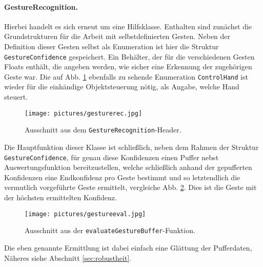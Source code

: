 	\paragraph{GestureRecognition.} Hierbei handelt es sich erneut um eine Hilfsklasse. Enthalten sind zunächst die Grundstrukturen für die Arbeit mit selbstdefinierten Gesten. Neben der Definition dieser Gesten selbst als Enumeration ist hier die Struktur \glqq \texttt{GestureConfidence}\grqq{} gespeichert. Ein Behälter, der für die verschiedenen Gesten Floats enthält, die angeben werden, wie sicher eine Erkennung der zugehörigen Geste war. Die auf Abb. \ref{fig:gestrechead} ebenfalls zu sehende Enumeration \texttt{ControlHand} ist wieder für die einhändige Objektsteuerung nötig, als Angabe, welche Hand steuert.\par
	\begin{figure}[h]
	\centering
	\texttt{[image: pictures/gesturerec.jpg]}
	\caption{Ausschnitt aus dem \texttt{GestureRecognition}-Header.}\label{fig:gestrechead}
	\end{figure}	
	Die Hauptfunktion dieser Klasse ist schließlich, neben dem Rahmen der Struktur \texttt{GestureConfidence}, für genau diese Konfidenzen einen Puffer nebst Auswertungsfunktion bereitzustellen, welche schließlich anhand der gepufferten Konfidenzen eine Endkonfidenz pro Geste bestimmt und so letztendlich die vermutlich vorgeführte Geste ermittelt, vergleiche Abb. \ref{fig:evalgestbuf}. Dies ist die Geste mit der höchsten ermittelten Konfidenz.
	\begin{figure}
	\centering
	\texttt{[image: pictures/gestureeval.jpg]}
	\caption{Ausschnitt aus der \texttt{evaluateGestureBuffer}-Funktion.}\label{fig:evalgestbuf}
	\end{figure}
	Die eben genannte \glqq Ermittlung\grqq{} ist dabei einfach eine Glättung der Pufferdaten, Näheres siehe Abschnitt \ref{sec:robustheit}.\par\medskip
